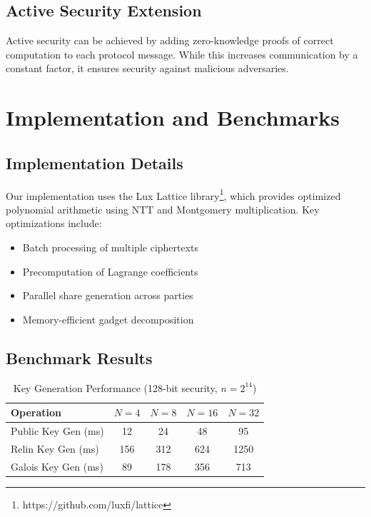 \documentclass[11pt,a4paper]{article}
\begin{document}
\subsection{Active Security Extension}

Active security can be achieved by adding zero-knowledge proofs of correct computation to each protocol message. While this increases communication by a constant factor, it ensures security against malicious adversaries.

\section{Implementation and Benchmarks}

\subsection{Implementation Details}

Our implementation uses the Lux Lattice library\footnote{https://github.com/luxfi/lattice}, which provides optimized polynomial arithmetic using NTT and Montgomery multiplication. Key optimizations include:

\begin{itemize}
    \item Batch processing of multiple ciphertexts
    \item Precomputation of Lagrange coefficients
    \item Parallel share generation across parties
    \item Memory-efficient gadget decomposition
\end{itemize}

\subsection{Benchmark Results}

\begin{table}[h]
\centering
\caption{Key Generation Performance (128-bit security, $n = 2^{14}$)}
\begin{tabular}{@{}lcccc@{}}
\toprule
Operation & $N=4$ & $N=8$ & $N=16$ & $N=32$ \\
\midrule
Public Key Gen (ms) & 12 & 24 & 48 & 95 \\
Relin Key Gen (ms) & 156 & 312 & 624 & 1250 \\
Galois Key Gen (ms) & 89 & 178 & 356 & 713 \\
\bottomrule
\end{tabular}
\end{table}
\end{document}
